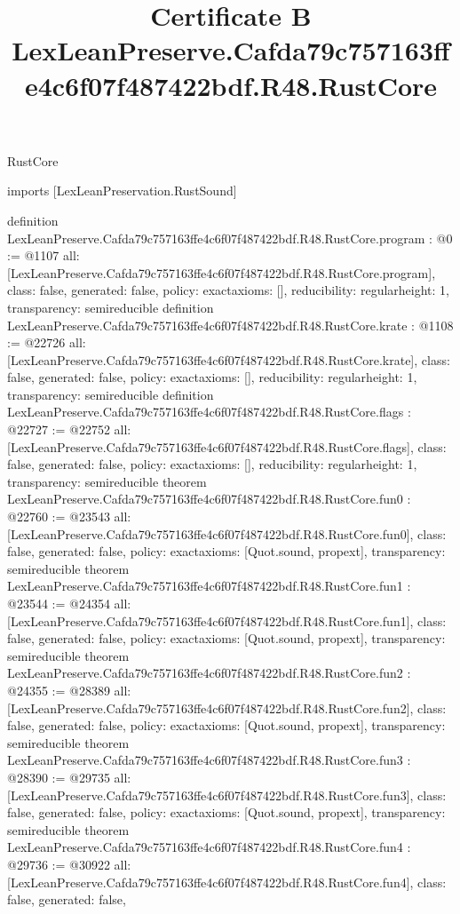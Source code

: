\begin{lexlean}{RustCore}
\title{Certificate B LexLeanPreserve.Cafda79c757163ffe4c6f07f487422bdf.R48.RustCore}
\begin{coremodule}
imports [LexLeanPreservation.RustSound]

definition LexLeanPreserve.Cafda79c757163ffe4c6f07f487422bdf.R48.RustCore.program : @0 := @1107 {
  all: [LexLeanPreserve.Cafda79c757163ffe4c6f07f487422bdf.R48.RustCore.program],
  class: false,
  generated: false,
  policy: exact{axioms: []},
  reducibility: regular{height: 1},
  transparency: semireducible
}
definition LexLeanPreserve.Cafda79c757163ffe4c6f07f487422bdf.R48.RustCore.krate : @1108 := @22726 {
  all: [LexLeanPreserve.Cafda79c757163ffe4c6f07f487422bdf.R48.RustCore.krate],
  class: false,
  generated: false,
  policy: exact{axioms: []},
  reducibility: regular{height: 1},
  transparency: semireducible
}
definition LexLeanPreserve.Cafda79c757163ffe4c6f07f487422bdf.R48.RustCore.flags : @22727 := @22752 {
  all: [LexLeanPreserve.Cafda79c757163ffe4c6f07f487422bdf.R48.RustCore.flags],
  class: false,
  generated: false,
  policy: exact{axioms: []},
  reducibility: regular{height: 1},
  transparency: semireducible
}
theorem LexLeanPreserve.Cafda79c757163ffe4c6f07f487422bdf.R48.RustCore.fun0 : @22760 := @23543 {
  all: [LexLeanPreserve.Cafda79c757163ffe4c6f07f487422bdf.R48.RustCore.fun0],
  class: false,
  generated: false,
  policy: exact{axioms: [Quot.sound, propext]},
  transparency: semireducible
}
theorem LexLeanPreserve.Cafda79c757163ffe4c6f07f487422bdf.R48.RustCore.fun1 : @23544 := @24354 {
  all: [LexLeanPreserve.Cafda79c757163ffe4c6f07f487422bdf.R48.RustCore.fun1],
  class: false,
  generated: false,
  policy: exact{axioms: [Quot.sound, propext]},
  transparency: semireducible
}
theorem LexLeanPreserve.Cafda79c757163ffe4c6f07f487422bdf.R48.RustCore.fun2 : @24355 := @28389 {
  all: [LexLeanPreserve.Cafda79c757163ffe4c6f07f487422bdf.R48.RustCore.fun2],
  class: false,
  generated: false,
  policy: exact{axioms: [Quot.sound, propext]},
  transparency: semireducible
}
theorem LexLeanPreserve.Cafda79c757163ffe4c6f07f487422bdf.R48.RustCore.fun3 : @28390 := @29735 {
  all: [LexLeanPreserve.Cafda79c757163ffe4c6f07f487422bdf.R48.RustCore.fun3],
  class: false,
  generated: false,
  policy: exact{axioms: [Quot.sound, propext]},
  transparency: semireducible
}
theorem LexLeanPreserve.Cafda79c757163ffe4c6f07f487422bdf.R48.RustCore.fun4 : @29736 := @30922 {
  all: [LexLeanPreserve.Cafda79c757163ffe4c6f07f487422bdf.R48.RustCore.fun4],
  class: false,
  generated: false,
}
\end{coremodule}
\end{lexlean}
